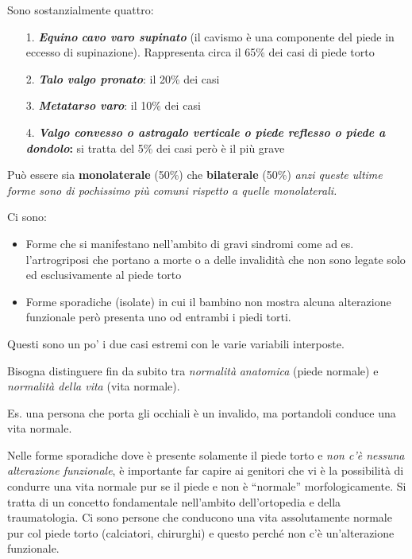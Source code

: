 Sono sostanzialmente quattro:

\begin{itemize}
\item[1.]
  \emph{\textbf{Equino} \textbf{cavo varo supinato}} (il cavismo è una componente del piede in eccesso di supinazione). Rappresenta circa il 65\% dei casi di piede torto
\item[2.]
  \textbf{\emph{Talo valgo pronato}}: il 20\% dei casi
\item[3.]
  \textbf{\emph{Metatarso varo}}: il 10\% dei casi
\item[4.]
  \textbf{\emph{Valgo convesso o astragalo verticale o \emph{piede reflesso} o piede a dondolo}:} si tratta del 5\% dei casi però è il più grave
\end{itemize}

Può essere sia \textbf{monolaterale} (50\%) che \textbf{bilaterale} (50\%) \emph{anzi queste ultime forme sono di pochissimo più comuni rispetto a quelle monolaterali.}

Ci sono:

\begin{itemize}
\item
  Forme che si manifestano nell'ambito di gravi sindromi come ad es. l'artrogriposi che portano a morte o a delle invalidità che non sono legate solo ed esclusivamente al piede torto
\item
  Forme sporadiche (isolate) in cui il bambino non mostra alcuna alterazione funzionale però presenta uno od entrambi i piedi torti.
\end{itemize}

Questi sono un po' i due casi estremi con le varie variabili interposte.

Bisogna distinguere fin da subito tra \emph{normalità} \emph{anatomica} (piede normale) e \emph{normalità della vita} (vita normale).

Es. una persona che porta gli occhiali è un invalido, ma portandoli conduce una vita normale.

Nelle forme sporadiche dove è presente solamente il piede torto e \emph{non c'è nessuna alterazione funzionale}, è importante far capire ai genitori che vi è la possibilità di condurre una vita normale pur se il piede e non è ``normale'' morfologicamente. Si tratta di un concetto
fondamentale nell'ambito dell'ortopedia e della traumatologia. Ci sono persone che conducono una vita assolutamente normale pur col piede torto (calciatori, chirurghi) e questo perché non c'è un'alterazione
funzionale.

